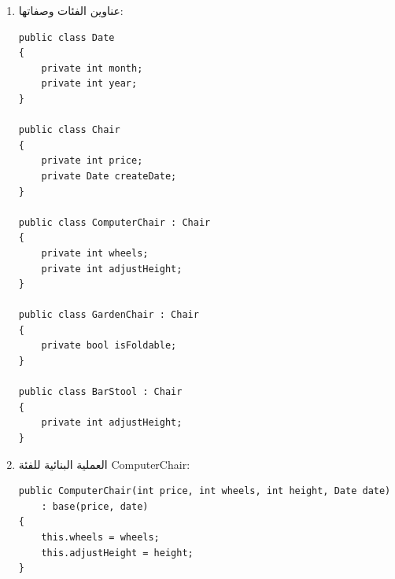 \begin{boxSolution}
\begin{enumerate}[label=\textbf{(\arabic*)}, start=2, itemsep=0.5em]
    \item عناوين الفئات وصفاتها:
\begin{boxCode}
\begin{english}
\begin{verbatim}
public class Date
{
    private int month;
    private int year;
}

public class Chair
{
    private int price;
    private Date createDate;
}

public class ComputerChair : Chair
{
    private int wheels;
    private int adjustHeight;
}

public class GardenChair : Chair
{
    private bool isFoldable;
}

public class BarStool : Chair
{
    private int adjustHeight;
}
\end{verbatim}
\end{english}
\end{boxCode}

    \item العملية البنائية للفئة \textenglish{ComputerChair}:
\begin{boxCode}
\begin{english}
\begin{verbatim}
public ComputerChair(int price, int wheels, int height, Date date)
    : base(price, date)
{
    this.wheels = wheels;
    this.adjustHeight = height;
}
\end{verbatim}
\end{english}
\end{boxCode}
\end{enumerate}
\end{boxSolution}

\filbreak

